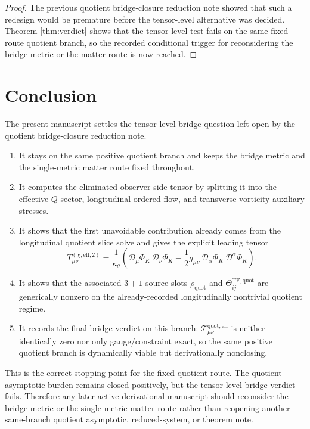 \documentclass[11pt]{article}
\newcommand{\EffAux}{\mathcal T_{\mu\nu}^{\mathrm{quot,eff}}}
\newcommand{\Dperp}{\mathcal D}
\begin{document}
\begin{proof}
The previous quotient bridge-closure reduction note showed that such a redesign would be premature before the tensor-level alternative was decided. Theorem \ref{thm:verdict} shows that the tensor-level test fails on the same fixed-route quotient branch, so the recorded conditional trigger for reconsidering the bridge metric or the matter route is now reached.
\end{proof}

\section{Conclusion}

The present manuscript settles the tensor-level bridge question left open by the quotient bridge-closure reduction note.
\begin{enumerate}
    \item It stays on the same positive quotient branch and keeps the bridge metric and the single-metric matter route fixed throughout.
    \item It computes the eliminated observer-side tensor by splitting it into the effective \(Q\)-sector, longitudinal ordered-flow, and transverse-vorticity auxiliary stresses.
    \item It shows that the first unavoidable contribution already comes from the longitudinal quotient slice solve and gives the explicit leading tensor
    \[
    T_{\mu\nu}^{(\chi,\mathrm{eff},2)}
    =
    \frac{1}{\kappa_\theta}
    \left(
    \Dperp_\mu\Phi_K\,\Dperp_\nu\Phi_K
    -\frac12 g_{\mu\nu}\,\Dperp_\alpha\Phi_K\,\Dperp^\alpha\Phi_K
    \right).
    \]
    \item It shows that the associated \(3+1\) source slots \(\rho_{\mathrm{quot}}\) and \(\Theta_{ij}^{\mathrm{TF,quot}}\) are generically nonzero on the already-recorded longitudinally nontrivial quotient regime.
    \item It records the final bridge verdict on this branch: \(\EffAux\) is neither identically zero nor only gauge/constraint exact, so the same positive quotient branch is dynamically viable but derivationally nonclosing.
\end{enumerate}

This is the correct stopping point for the fixed quotient route. The quotient asymptotic burden remains closed positively, but the tensor-level bridge verdict fails. Therefore any later active derivational manuscript should reconsider the bridge metric or the single-metric matter route rather than reopening another same-branch quotient asymptotic, reduced-system, or theorem note.
\end{document}
